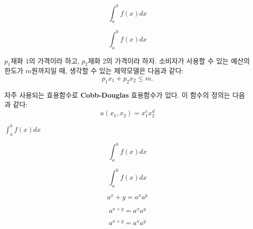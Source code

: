 \documentclass{oblivoir}
\begin{document}
\[ \int_{a}^b f(x)dx \]

\begin{equation}
\int_{a}^b f(x) dx
\end{equation}

$p_1$\을 재화 1의 가격이라 하고, $p_2$\을 재화 2의 가격이라 하자. 소비자가 사용할 수 있는 예산의 한도가 $m$원까지일 때, 생각할 수 있는 제약모델은 다음과 같다:
\begin{equation}
p_1 x_1 + p_2 x_2 
\leq m.
\end{equation}

자주 사용되는 효용함수로 \textbf{Cobb-Douglas} 효용함수가 있다. 이 함수의 정의는 다음과 같다:
\[ u(x_1, x_2) = x_1^c x_2^d \]

$\int_a^b f(x)dx$

\[ \int_{a}^b f(x)dx \]

\begin{equation}
\int_{a}^b f(x) dx
\end{equation}

\begin{equation}
a^x+y = a^x a^y
\end{equation}

\begin{equation*}
a^{x+y} = a^x a^y
\end{equation*}

\[ a^{x+y} = a^x a^y \]
\end{document}
